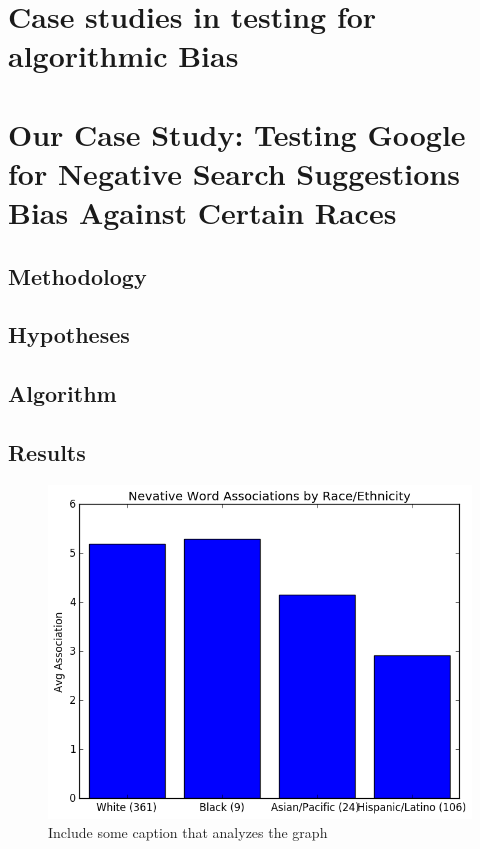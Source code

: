 \documentclass[sigconf]{acmart}
\begin{document}
\section{Case studies in testing for algorithmic Bias}



\section{Our Case Study: Testing Google for Negative Search Suggestions Bias Against Certain Races}



\subsection{Methodology}

\subsection{Hypotheses}

\subsection{Algorithm}

\subsection{Results}

\begin{figure}
\includegraphics[width=\columnwidth]{images/fig1.png}
\caption{Include some caption that analyzes the graph}
\label{Figure 1}
\end{figure}
\end{document}
